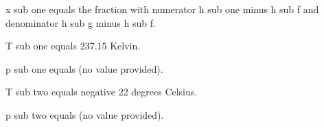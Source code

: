 x sub one equals the fraction with numerator h sub one minus h sub f and denominator h sub g minus h sub f.

T sub one equals 237.15 Kelvin.

p sub one equals (no value provided).

T sub two equals negative 22 degrees Celsius.

p sub two equals (no value provided).
